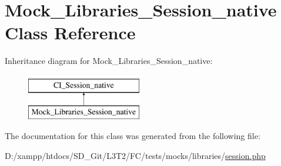 \hypertarget{class_mock___libraries___session__native}{}\section{Mock\+\_\+\+Libraries\+\_\+\+Session\+\_\+native Class Reference}
\label{class_mock___libraries___session__native}
Inheritance diagram for Mock\+\_\+\+Libraries\+\_\+\+Session\+\_\+native\+:\begin{figure}[H]
\begin{center}
\leavevmode
\includegraphics[height=2.000000cm]{class_mock___libraries___session__native}
\end{center}
\end{figure}


The documentation for this class was generated from the following file\+:\begin{DoxyCompactItemize}
\item 
D\+:/xampp/htdocs/\+S\+D\+\_\+\+Git/\+L3\+T2/\+F\+C/tests/mocks/libraries/\hyperlink{tests_2mocks_2libraries_2_session_8php}{session.\+php}\end{DoxyCompactItemize}
